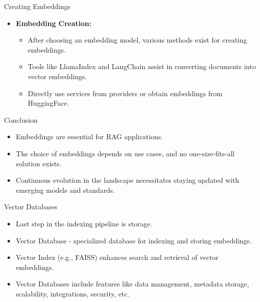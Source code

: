 \begin{frame}[fragile]{Creating Embeddings}
  \begin{itemize}
    \item \textbf{Embedding Creation:}
      \begin{itemize}
        \item After choosing an embedding model, various methods exist for creating embeddings.
        \item Tools like LlamaIndex and LangChain assist in converting documents into vector embeddings.
        \item Directly use services from providers or obtain embeddings from HuggingFace.
      \end{itemize}
  \end{itemize}
\end{frame}

\begin{frame}[fragile]{Conclusion}
  \begin{itemize}
    \item Embeddings are essential for RAG applications.
    \item The choice of embeddings depends on use cases, and no one-size-fits-all solution exists.
    \item Continuous evolution in the landscape necessitates staying updated with emerging models and standards.
  \end{itemize}
\end{frame}

\begin{frame}[fragile]{Vector Databases}
  \begin{itemize}
    \item Last step in the indexing pipeline is storage.
    \item Vector Database - specialized database for indexing and storing embeddings.
    \item Vector Index (e.g., FAISS) enhances search and retrieval of vector embeddings.
    \item Vector Databases include features like data management, metadata storage, scalability, integrations, security, etc.
  \end{itemize}
\end{frame}

